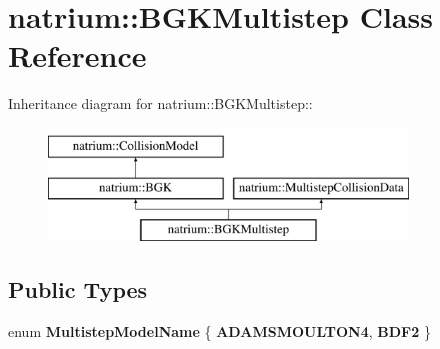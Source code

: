 \hypertarget{classnatrium_1_1BGKMultistep}{
\section{natrium::BGKMultistep Class Reference}
\label{classnatrium_1_1BGKMultistep}
}
Inheritance diagram for natrium::BGKMultistep::\begin{figure}[H]
\begin{center}
\leavevmode
\includegraphics[height=3cm]{classnatrium_1_1BGKMultistep}
\end{center}
\end{figure}
\subsection*{Public Types}
\begin{DoxyCompactItemize}
\item 
enum {\bfseries MultistepModelName} \{ {\bfseries ADAMSMOULTON4}, 
{\bfseries BDF2}
 \}
\end{DoxyCompactItemize}
